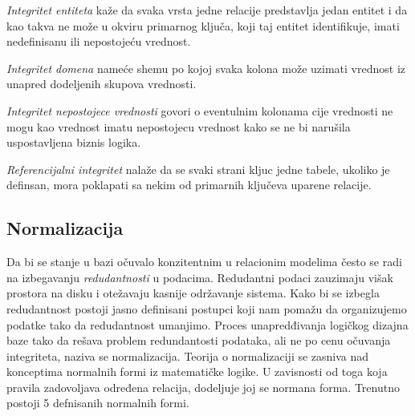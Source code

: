 \documentclass[12pt,oneside]{memoir}
\begin{document}
 \textit{Integritet entiteta} kaže da svaka vrsta jedne relacije predstavlja jedan entitet i da kao takva ne može u okviru primarnog ključa, koji taj entitet identifikuje, imati nedefinisanu ili nepostojeću vrednost.

\textit{Integritet domena} nameće shemu po kojoj svaka kolona može uzimati vrednost iz unapred dodeljenih skupova vrednosti. 

\textit{Integritet nepostojece vrednosti} govori o eventulnim kolonama cije vrednosti ne mogu kao vrednost imatu nepostojecu vrednost kako se ne bi narušila uspostavljena biznis logika. 

\textit{Referencijalni integritet} nalaže da se svaki strani kljuc jedne tabele, ukoliko je definsan,  mora poklapati sa nekim od primarnih ključeva uparene relacije.

\subsection{Normalizacija}

Da bi se stanje u bazi očuvalo konzitentnim u relacionim modelima često se radi na izbegavanju \textit{redudantnosti} u podacima. Redudantni podaci zauzimaju višak prostora na disku i otežavaju kasnije održavanje sistema. Kako bi se izbegla redudantnost postoji jasno definisani postupci koji nam pomažu da organizujemo podatke tako da redudantnost umanjimo. Proces unapredđivanja logičkog dizajna baze tako da rešava problem redundantosti podataka, ali ne po cenu očuvanja integriteta, naziva se normalizacija. Teorija o normalizaciji se zasniva nad konceptima normalnih formi iz matematičke logike. U zavisnosti od toga koja pravila zadovoljava određena relacija, dodeljuje joj se normana forma. Trenutno postoji 5 defnisanih normalnih formi. 
\end{document}
